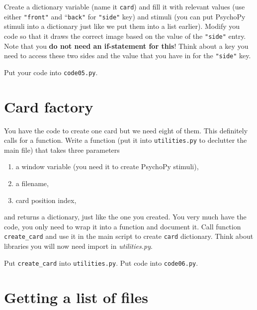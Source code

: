 \documentclass[
]{book}
\providecommand{\tightlist}{%
  \setlength{\itemsep}{0pt}\setlength{\parskip}{0pt}}
\begin{document}
Create a dictionary variable (name it \texttt{card}) and fill it with relevant values (use either \texttt{"front"} and ``\texttt{back"} for \texttt{"side"} key) and stimuli (you can put PsychoPy stimuli into a dictionary just like we put them into a list earlier). Modify you code so that it draws the correct image based on the value of the \texttt{"side"} entry. Note that you \textbf{do not need an if-statement for this}! Think about a key you need to access these two sides and the value that you have in for the \texttt{"side"} key.

Put your code into \texttt{code05.py}.

\hypertarget{card-factory}{%
\section{Card factory}\label{card-factory}}

You have the code to create one card but we need eight of them. This definitely calls for a function. Write a function (put it into \texttt{utilities.py} to declutter the main file) that takes three parameters

\begin{enumerate}
\def\labelenumi{\arabic{enumi}.}
\tightlist
\item
  a window variable (you need it to create PsychoPy stimuli),
\item
  a filename,
\item
  card position index,
\end{enumerate}

and returns a dictionary, just like the one you created. You very much have the code, you only need to wrap it into a function and document it. Call function \texttt{create\_card} and use it in the main script to create \texttt{card} dictionary. Think about libraries you will now need import in \emph{utilities.py}.

Put \texttt{create\_card} into \texttt{utilities.py}.
Put code into \texttt{code06.py}.

\hypertarget{getting-a-list-of-files}{%
\section{Getting a list of files}\label{getting-a-list-of-files}}
\end{document}
